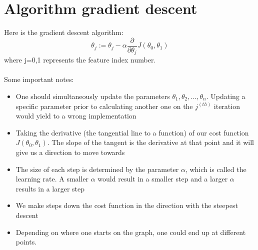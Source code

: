 \section{Algorithm gradient descent}
Here is the gradient descent algorithm:\\
\begin{equation}
\theta_j := \theta_j - \alpha \frac{\partial}{\partial \theta_j} J(\theta_0, \theta_1)
\end{equation}
where j=0,1 represents the feature index number.
\\
\\
Some important notes:
\begin{itemize}
	\item One should simultaneously update the parameters $\theta_1, \theta_2, ..., \theta_n$. Updating a specific parameter prior to calculating another one on the $j^{(th)}$ iteration would yield to a wrong implementation
	\item Taking the derivative (the tangential line to a function) of our cost function $J(\theta_0,\theta_1)$. The slope of the tangent is the derivative at that point and it will give us a direction to move towards
	\item The size of each step is determined by the parameter $\alpha$, which is called the learning rate. A smaller $\alpha$ would result in a smaller step and a larger $\alpha$ results in a larger step
	\item We make steps down the cost function in the direction with the steepest descent
	\item Depending on where one starts on the graph, one could end up at different points.
\end{itemize}